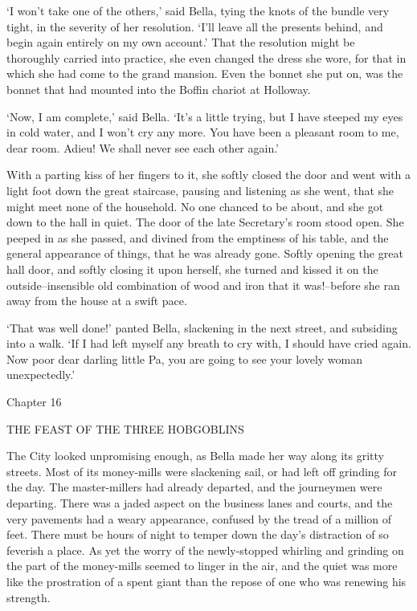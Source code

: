 ‘I won’t take one of the others,’ said Bella, tying the knots of the
bundle very tight, in the severity of her resolution. ‘I’ll leave all
the presents behind, and begin again entirely on my own account.’ That
the resolution might be thoroughly carried into practice, she even
changed the dress she wore, for that in which she had come to the grand
mansion. Even the bonnet she put on, was the bonnet that had mounted
into the Boffin chariot at Holloway.

‘Now, I am complete,’ said Bella. ‘It’s a little trying, but I have
steeped my eyes in cold water, and I won’t cry any more. You have been
a pleasant room to me, dear room. Adieu! We shall never see each other
again.’

With a parting kiss of her fingers to it, she softly closed the door and
went with a light foot down the great staircase, pausing and listening
as she went, that she might meet none of the household. No one chanced
to be about, and she got down to the hall in quiet. The door of the late
Secretary’s room stood open. She peeped in as she passed, and divined
from the emptiness of his table, and the general appearance of things,
that he was already gone. Softly opening the great hall door, and
softly closing it upon herself, she turned and kissed it on the
outside--insensible old combination of wood and iron that it
was!--before she ran away from the house at a swift pace.

‘That was well done!’ panted Bella, slackening in the next street, and
subsiding into a walk. ‘If I had left myself any breath to cry with, I
should have cried again. Now poor dear darling little Pa, you are going
to see your lovely woman unexpectedly.’



Chapter 16

THE FEAST OF THE THREE HOBGOBLINS


The City looked unpromising enough, as Bella made her way along its
gritty streets. Most of its money-mills were slackening sail, or had
left off grinding for the day. The master-millers had already departed,
and the journeymen were departing. There was a jaded aspect on
the business lanes and courts, and the very pavements had a weary
appearance, confused by the tread of a million of feet. There must be
hours of night to temper down the day’s distraction of so feverish a
place. As yet the worry of the newly-stopped whirling and grinding on
the part of the money-mills seemed to linger in the air, and the quiet
was more like the prostration of a spent giant than the repose of one
who was renewing his strength.

